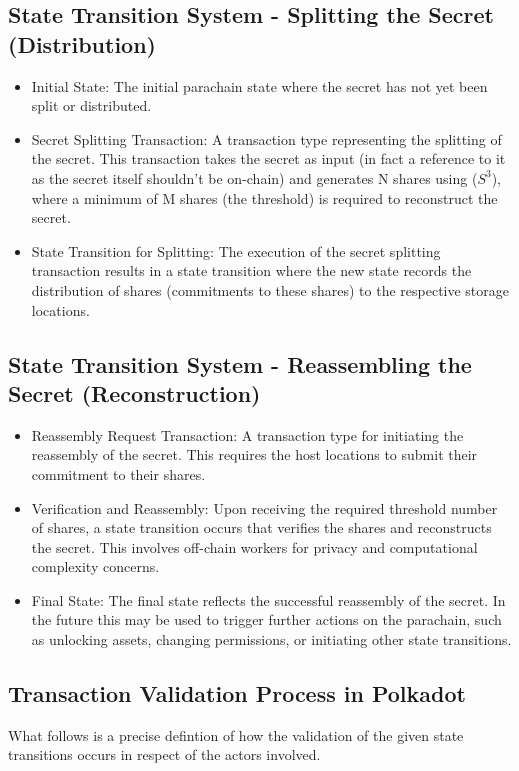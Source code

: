 \documentclass{tufte-handout}
\begin{document}
\subsection{State Transition System - Splitting the Secret (Distribution)}
\begin{itemize}
\item Initial State: The initial parachain state where the secret has not yet been split or distributed.
\item Secret Splitting Transaction: A transaction type representing the splitting of the secret. This transaction takes the secret as input (in fact a reference
to it as the secret itself shouldn't be on-chain) and generates N shares using ($S^3$), where a minimum of M shares (the threshold) is required to reconstruct
the secret.
\item State Transition for Splitting: The execution of the secret splitting transaction results in a state transition where the new state records the
distribution of shares (commitments to these shares) to the respective storage locations.
\end{itemize}
\subsection{State Transition System - Reassembling the Secret (Reconstruction)}
\begin{itemize}
\item  Reassembly Request Transaction: A transaction type for initiating the reassembly of the secret. This requires the host locations to
submit their commitment to their shares.
\item  Verification and Reassembly: Upon receiving the required threshold number of shares, a state transition occurs that verifies the shares and reconstructs
the secret. This involves off-chain workers for privacy and computational complexity concerns.
\item  Final State: The final state reflects the successful reassembly of the secret. In the future this may be used to trigger further actions on the parachain,
such as unlocking assets, changing permissions, or initiating other state transitions.
\end{itemize}
\subsection{Transaction Validation Process in Polkadot}
What follows is a precise defintion of how the validation of the given state transitions occurs in respect of the actors involved.
\end{document}

